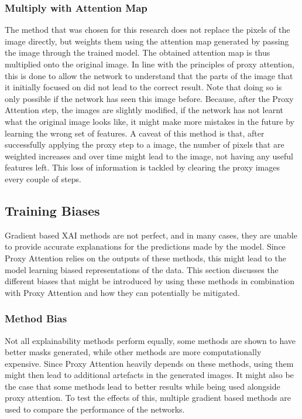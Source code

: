 \subsubsection{Multiply with Attention Map}
The method that was chosen for this research does not replace the pixels of the image directly, but weights them using the attention map generated by passing the image through the trained model. 
The obtained attention map is thus multiplied onto the original image. In line with the principles of proxy attention, this is done to allow the network to understand that the parts of the image that it initially focused on did not lead to the correct result. Note that doing so is only possible if the network has seen this image before. Because, after the Proxy Attention step, the images are slightly modified, if the network has not learnt what the original image looks like, it might make more mistakes in the future by learning the wrong set of features.
A caveat of this method is that, after successfully applying the proxy step to a image, the number of pixels that are weighted increases and over time might lead to the image, not having any useful features left. This loss of information is tackled by clearing the proxy images every couple of steps.


\subsection{Training Biases}
Gradient based XAI methods are not perfect, and in many cases, they are unable to provide accurate explanations for the predictions made by the model. Since Proxy Attention relies on the outputs of these methods, this might lead to the model learning biased representations of the data. This section discusses the different biases that might be introduced by using these methods in combination with Proxy Attention and how they can potentially be mitigated.

\subsubsection{Method Bias}
Not all explainability methods perform equally, some methods are shown to have better masks generated, while other methods are more computationally expensive. Since Proxy Attention heavily depends on these methods, using them might then lead to additional artefacts in the generated images. It might also be the case that some methods lead to better results while being used alongside proxy attention. To test the effects of this, multiple gradient based methods are used to compare the performance of the networks.

